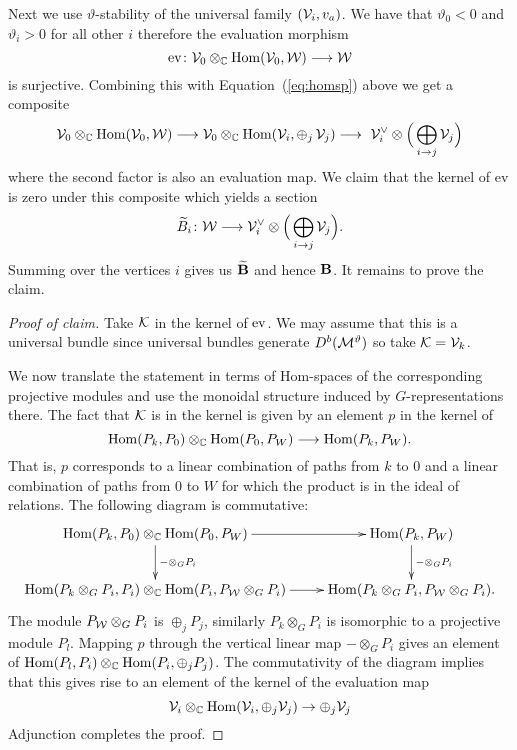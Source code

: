 \documentclass{amsart}
\theoremstyle{definition}
\begin{document}
Next we use $\vartheta$-stability of the universal family $(\mathcal{V}_i, v_a)$.
We have that $\vartheta_0<0$ and $\vartheta_i>0$ for all other $i$ therefore the evaluation morphism $$\text{ev} \colon \mathcal{V}_0 \otimes_{\mathbb{C}} {\operatorname{Hom}}(\mathcal{V}_0, \mathcal{W}) \longrightarrow \mathcal{W}$$ is surjective.
Combining this with Equation~(\ref{eq:homsp}) above we get a composite
$$\mathcal{V}_0 \otimes_{\mathbb{C}} {\operatorname{Hom}}(\mathcal{V}_0, \mathcal{W}) \longrightarrow \mathcal{V}_0 \otimes_{\mathbb{C}} {\operatorname{Hom}}(\mathcal{V}_i, \oplus_j \, \mathcal{V}_j) \longrightarrow\ \mathcal{V}_i^\vee \otimes \Big(\bigoplus_{i \rightarrow j}\mathcal{V}_j\Big)$$
where the second factor is also an evaluation map.
We claim that the kernel of ev is zero under this composite which yields a section 
$$\widetilde{B}_i \colon \mathcal{W} \longrightarrow \mathcal{V}_i^\vee \otimes \Big(\bigoplus_{i \rightarrow j}\mathcal{V}_j\Big).$$
Summing over the vertices $i$ gives us $\widetilde{\mathbf{B}}$ and hence $\mathbf{B}$.
It remains to prove the claim.

\begin{proof}[Proof of claim]
Take $\mathcal{K}$ in the kernel of $\operatorname{ev}$.
We may assume that this is a universal bundle since universal bundles generate $D^b(\mathcal{M}^\vartheta)$ so take $\mathcal{K}=\mathcal{V}_k$.

We now translate the statement in terms of Hom-spaces of the corresponding projective modules and use the monoidal structure induced by $G$-representations there.
The fact that $\mathcal{K}$ is in the kernel is given by an element $p$ in the kernel of 
\begin{equation}
    \operatorname{Hom}(P_k, P_0) \otimes_{\mathbb{C}} \operatorname{Hom}(P_0, P_W) \longrightarrow \operatorname{Hom}(P_k, P_W).
\end{equation}
That is, $p$ corresponds to a linear combination of paths from $k$ to $0$ and a linear combination of paths from $0$ to $W$ for which the product is in the ideal of relations.
The following diagram is commutative:
\begin{equation*}
    \xymatrix{\Hom(P_k, P_0) \otimes_\bC \Hom(P_0, P_W) \ar[r] \ar[d]^{- \otimes_G P_i} & \Hom(P_k, P_W) \ar[d]^{- \otimes_G P_i} \\
    \Hom(P_k \otimes_G P_i, P_i) \otimes_\bC \Hom(P_i, P_\cW \otimes_G P_i) \ar[r] & \Hom(P_k \otimes_G P_i, P_\cW \otimes_G P_i).}
\end{equation*}
The module $P_{\mathcal{W}} \otimes_G P_i$ is $\oplus_j P_j$, similarly $P_k \otimes_G P_i$ is isomorphic to a projective module $P_l$. 
Mapping $p$ through the vertical linear map $- \otimes_G P_i$ gives an element of $\operatorname{Hom}(P_l, P_i) \otimes_{\mathbb{C}} \operatorname{Hom}(P_i, \oplus_j P_j)$.
The commutativity of the diagram implies that this gives rise to an element of the kernel of the evaluation map $$\mathcal{V}_i \otimes_{\mathbb{C}} \operatorname{Hom}(\mathcal{V}_i, \oplus_j \mathcal{V}_j) \rightarrow \oplus_j \mathcal{V}_j$$
Adjunction completes the proof.
\end{proof}
\end{document}
